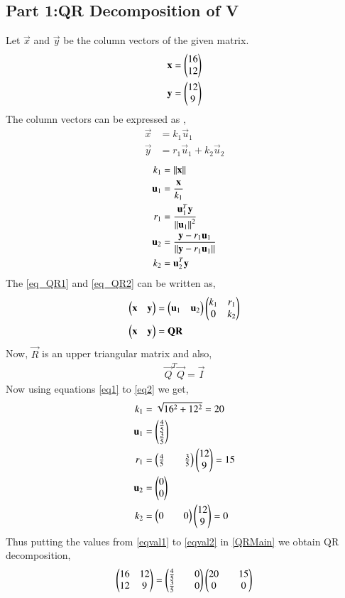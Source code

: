 \documentclass[journal,12pt,twocolumn]{IEEEtran}
\begin{document}
\subsection{Part 1:QR Decomposition of V}
Let $\vec{x}$ and $\vec{y}$ be the column vectors of the given matrix.
\begin{align}
    \mathbf{x} &= \begin{pmatrix}16 \\12 \end{pmatrix}\\
    \mathbf{y} &= \begin{pmatrix}12 \\ 9\end{pmatrix}
\end{align}
The column vectors can be expressed as ,
\begin{align}
    \vec{x} &= k_1\vec{u}_1\label{eq_QR1}\\
    \vec{y} &= r_1\vec{u}_1+k_2\vec{u}_2\label{eq_QR2}
\end{align}
\begin{align}
    k_1 &= \left\lVert\mathbf{x}\right\rVert\label{eq1}\\
    \mathbf{u}_1 &= \frac{\mathbf{x}}{k_1}\\
    r_1 &= \frac{\mathbf{u}_1^T\mathbf{y}}{\left\lVert\mathbf{u}_1\right\rVert^2}\\
    \mathbf{u}_2 &= \frac{\mathbf{y} - r_1 \mathbf{u}_1}{\left\lVert\mathbf{y} - r_1 \mathbf{u}_1\right\rVert}\\
    k_2 &= {\mathbf{u}_2^T\mathbf{y}}\label{eq2}
\end{align}
The \eqref{eq_QR1} and \eqref{eq_QR2} can be written as, 
\begin{align}
\begin{pmatrix}\mathbf{x} & \mathbf{y}\end{pmatrix} &= \begin{pmatrix}\mathbf{u}_1 & \mathbf{u}_2\end{pmatrix}\begin{pmatrix}k_1 & r_1 \\ 0 & k_2\end{pmatrix}\label{QRMain}\\
\begin{pmatrix}\mathbf{x} & \mathbf{y}\end{pmatrix} &= \mathbf{Q}\mathbf{R}
\end{align}
Now, $\vec{R}$ is an upper triangular matrix and also,
\begin{align}
\vec{Q}^T\vec{Q}=\vec{I}
\end{align}
Now using equations \eqref{eq1} to \eqref{eq2} we get, 
\begin{align}
    k_1 &= \sqrt{16^2+12^2} = 20\label{eqval1}\\ 
    \mathbf{u}_1 &= \begin{pmatrix}\frac{4}{5} \\ \frac{3}{5}\end{pmatrix} \\
    r_1 &= \begin{pmatrix}\frac{4}{5}&&\frac{3}{5}\end{pmatrix}\begin{pmatrix}12 \\ 9\end{pmatrix} = 15\\ 
    \mathbf{u}_2 &= \begin{pmatrix}0 \\ 0\end{pmatrix} \\
    k_2 &= \begin{pmatrix}0&&0\end{pmatrix}\begin{pmatrix}12\\9\end{pmatrix} = 0\label{eqval2} 
\end{align}
Thus putting the values from \eqref{eqval1} to \eqref{eqval2} in \eqref{QRMain} we obtain QR decomposition,
\begin{align}
    \begin{pmatrix}16 & 12\\ 12 & 9\end{pmatrix} =\begin{pmatrix}\frac{4}{5}&&0\\\frac{3}{5}&&0\end{pmatrix}\begin{pmatrix}20 && 15\\0&&0\end{pmatrix}
\end{align}
\end{document}
